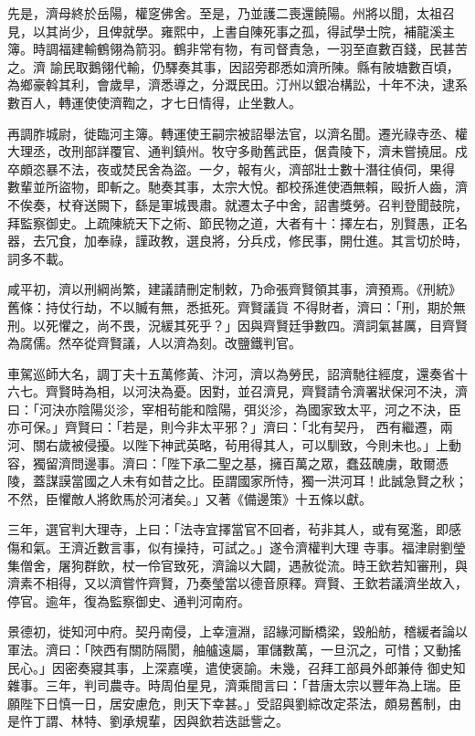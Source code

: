 \begin{pinyinscope}
 先是，濟母終於岳陽，權窆佛舍。至是，乃並護二喪還饒陽。州將以聞，太祖召見，以其尚少，且俾就學。雍熙中，上書自陳死事之孤，得試學士院，補龍溪主簿。時調福建輸鶴翎為箭羽。鶴非常有物，有司督責急，一羽至直數百錢，民甚苦之。濟
 諭民取鵝翎代輸，仍驛奏其事，因詔旁郡悉如濟所陳。縣有陂塘數百頃，為鄉豪斡其利，會歲旱，濟悉導之，分溉民田。汀州以銀冶構訟，十年不決，逮系數百人，轉運使使濟鞫之，才七日情得，止坐數人。



 再調胙城尉，徙臨河主簿。轉運使王嗣宗被詔舉法官，以濟名聞。遷光祿寺丞、權大理丞，改刑部詳覆官、通判鎮州。牧守多勛舊武臣，倨貴陵下，濟未嘗撓屈。戍卒頗恣暴不法，夜或焚民舍為盜。一夕，報有火，濟部壯士數十潛往偵伺，果得
 數輩並所盜物，即斬之。馳奏其事，太宗大悅。都校孫進使酒無賴，毆折人齒，濟不俟奏，杖脊送闕下，繇是軍城畏肅。就遷太子中舍，詔書獎勞。召判登聞鼓院，拜監察御史。上疏陳統天下之術、節民物之道，大者有十：擇左右，別賢愚，正名器，去冗食，加奉祿，謹政教，選良將，分兵戍，修民事，開仕進。其言切於時，詞多不載。



 咸平初，濟以刑綱尚繁，建議請刪定制敕，乃命張齊賢領其事，濟預焉。《刑統》舊條：持仗行劫，不以贓有無，悉抵死。齊賢議貨
 不得財者，濟曰：「刑，期於無刑。以死懼之，尚不畏，況緩其死乎？」因與齊賢廷爭數四。濟詞氣甚厲，目齊賢為腐儒。然卒從齊賢議，人以濟為刻。改鹽鐵判官。



 車駕巡師大名，調丁夫十五萬修黃、汴河，濟以為勞民，詔濟馳往經度，還奏省十六七。齊賢時為相，以河決為憂。因對，並召濟見，齊賢請令濟署狀保河不決，濟曰：「河決亦陰陽災沴，宰相茍能和陰陽，弭災沴，為國家致太平，河之不決，臣亦可保。」齊賢曰：「若是，則今非太平邪？」濟曰：「北有契丹，
 西有繼遷，兩河、關右歲被侵擾。以陛下神武英略，茍用得其人，可以馴致，今則未也。」上動容，獨留濟問邊事。濟曰：「陛下承二聖之基，擁百萬之眾，蠢茲醜虜，敢爾憑陵，蓋謀謨當國之人未有如昔之比。臣謂國家所恃，獨一洪河耳！此誠急賢之秋；不然，臣懼敵人將飲馬於河渚矣。」又著《備邊策》十五條以獻。



 三年，選官判大理寺，上曰：「法寺宜擇當官不回者，茍非其人，或有冤濫，即感傷和氣。王濟近數言事，似有操持，可試之。」遂令濟權判大理
 寺事。福津尉劉瑩集僧舍，屠狗群飲，杖一伶官致死，濟論以大闢，遇赦從流。時王欽若知審刑，與濟素不相得，又以濟嘗忤齊賢，乃奏瑩當以德音原釋。齊賢、王欽若議濟坐故入，停官。逾年，復為監察御史、通判河南府。



 景德初，徙知河中府。契丹南侵，上幸澶淵，詔緣河斷橋梁，毀船舫，稽緩者論以軍法。濟曰：「陜西有關防隔閡，舳艫遠屬，軍儲數萬，一旦沉之，可惜；又動搖民心。」因密奏寢其事，上深嘉嘆，遣使褒諭。未幾，召拜工部員外郎兼侍
 御史知雜事。三年，判司農寺。時周伯星見，濟乘間言曰：「昔唐太宗以豐年為上瑞。臣願陛下日慎一日，居安慮危，則天下幸甚。」受詔與劉綜改定茶法，頗易舊制，由是忤丁謂、林特、劉承規輩，因與欽若迭詆訾之。




\end{pinyinscope}
